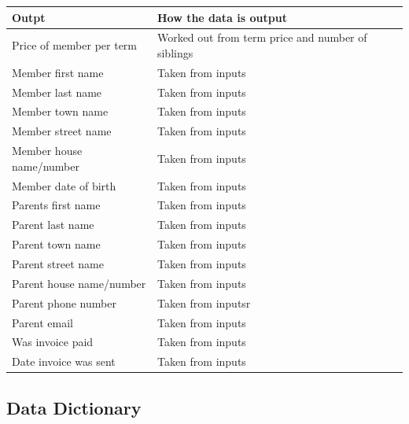 \begin{center}
	\begin{tabular}{|p{6cm}|p{6cm}|l}
		\hline
		\textbf{Outpt}                   & \textbf{How the data is output} \\ \hline   
		Price of member per term   & Worked out from term price and number of siblings \\ \hline
		Member first name              & Taken from inputs            \\ \hline
		Member last name               & Taken from inputs          \\ \hline
		Member town name             & Taken from inputs        \\ \hline
		Member street name            & Taken from inputs       \\ \hline  
		Member house name/number & Taken from inputs          \\ \hline
		Member date of birth           & Taken from inputs          \\ \hline
		Parents first name               & Taken from inputs             \\ \hline
		Parent last name                 & Taken from inputs              \\ \hline
		Parent town name               & Taken from inputs          \\ \hline
		Parent street name             & Taken from inputs           \\ \hline
		Parent house name/number & Taken from inputs            \\ \hline 
		Parent phone number         & Taken from inputsr             \\ \hline
		Parent email                         & Taken from inputs                \\ \hline
		Was invoice paid                  & Taken from inputs             \\ \hline
		Date invoice was sent          & Taken from inputs             \\ \hline
	\end{tabular}
\end{center}

\subsection{Data Dictionary}

